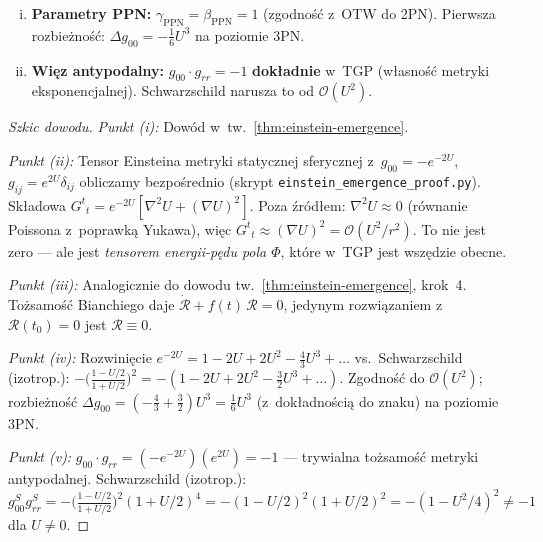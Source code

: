 \begin{theorem}
\begin{enumerate}[(i)]
  \item \textbf{Parametry PPN:} $\gamma_{\mathrm{PPN}} = \beta_{\mathrm{PPN}} = 1$
    (zgodno\'s\'c z~OTW do 2PN).
    Pierwsza rozbie\.zno\'s\'c: $\Delta g_{00} = -\frac{1}{6}U^3$
    na poziomie 3PN.

  \item \textbf{Wi\k{e}z antypodalny:}
    $g_{00}\cdot g_{rr} = -1$ \textbf{dok\l{}adnie} w~TGP
    (w\l{}asno\'s\'c metryki eksponencjalnej).
    Schwarzschild narusza to od $\mathcal{O}(U^2)$.
\end{enumerate}
\end{theorem}

\begin{proof}[Szkic dowodu]
\emph{Punkt (i):} Dow\'od w~tw.~\ref{thm:einstein-emergence}.

\emph{Punkt (ii):}
Tensor Einsteina metryki statycznej sferycznej z~$g_{00} = -e^{-2U}$,
$g_{ij} = e^{2U}\delta_{ij}$ obliczamy bezpo\'srednio
(skrypt \texttt{einstein\_emergence\_proof.py}).
Sk\l{}adowa $G^t{}_t = e^{-2U}[\nabla^2 U + (\nabla U)^2]$.
Poza \'zr\'od\l{}em: $\nabla^2 U \approx 0$ (r\'ownanie Poissona
z~poprawk\k{a} Yukawa), wi\k{e}c $G^t{}_t \approx (\nabla U)^2
= \mathcal{O}(U^2/r^2)$. To nie jest zero --- ale jest
\emph{tensorem energii-p\k{e}du pola $\Phi$}, kt\'ore w~TGP
jest wsz\k{e}dzie obecne.

\emph{Punkt (iii):}
Analogicznie do dowodu tw.~\ref{thm:einstein-emergence}, krok~4.
To\.zsamo\'s\'c Bianchiego daje
$\dot{\mathcal{R}} + f(t)\,\mathcal{R} = 0$, jedynym
rozwi\k{a}zaniem z~$\mathcal{R}(t_0) = 0$ jest
$\mathcal{R} \equiv 0$.

\emph{Punkt (iv):}
Rozwinięcie $e^{-2U} = 1 - 2U + 2U^2 - \frac{4}{3}U^3 + \ldots$
vs.\ Schwarzschild (izotrop.):
$-\bigl(\frac{1-U/2}{1+U/2}\bigr)^2 = -(1 - 2U + 2U^2 - \frac{3}{2}U^3 + \ldots)$.
Zgodno\'s\'c do $\mathcal{O}(U^2)$; rozbie\.zno\'s\'c
$\Delta g_{00} = (-\frac{4}{3} + \frac{3}{2})U^3 = \frac{1}{6}U^3$
(z~dok\l{}adno\'sci\k{a} do znaku) na poziomie 3PN.

\emph{Punkt (v):}
$g_{00}\cdot g_{rr} = (-e^{-2U})(e^{2U}) = -1$ --- trywialna
to\.zsamo\'s\'c metryki antypodalnej. Schwarzschild (izotrop.):
$g_{00}^S g_{rr}^S = -\bigl(\frac{1-U/2}{1+U/2}\bigr)^2(1+U/2)^4
= -(1-U/2)^2(1+U/2)^2 = -(1 - U^2/4)^2 \neq -1$
dla $U \neq 0$.
\end{proof}


